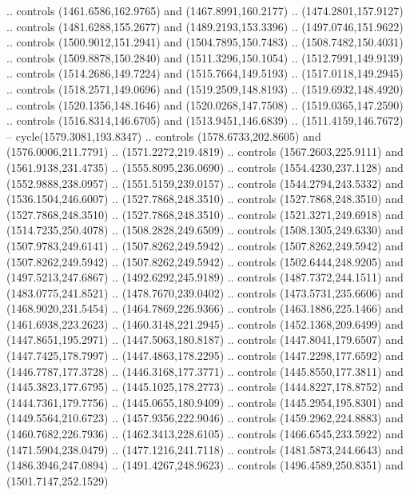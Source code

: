 \begin{scope}[shift={(-22.88722,-49.76189)}]
\begin{scope}[shift={(-739.46591,328.36782)}]
      .. controls (1461.6586,162.9765) and (1467.8991,160.2177) ..
      (1474.2801,157.9127) .. controls (1481.6288,155.2677) and (1489.2193,153.3396)
      .. (1497.0746,151.9622) .. controls (1500.9012,151.2941) and
      (1504.7895,150.7483) .. (1508.7482,150.4031) .. controls (1509.8878,150.2840)
      and (1511.3296,150.1054) .. (1512.7991,149.9139) .. controls
      (1514.2686,149.7224) and (1515.7664,149.5193) .. (1517.0118,149.2945) ..
      controls (1518.2571,149.0696) and (1519.2509,148.8193) .. (1519.6932,148.4920)
      .. controls (1520.1356,148.1646) and (1520.0268,147.7508) ..
      (1519.0365,147.2590) .. controls (1516.8314,146.6705) and (1513.9451,146.6839)
      .. (1511.4159,146.7672) -- cycle(1579.3081,193.8347) .. controls
      (1578.6733,202.8605) and (1576.0006,211.7791) .. (1571.2272,219.4819) ..
      controls (1567.2603,225.9111) and (1561.9138,231.4735) .. (1555.8095,236.0690)
      .. controls (1554.4230,237.1128) and (1552.9888,238.0957) ..
      (1551.5159,239.0157) .. controls (1544.2794,243.5332) and (1536.1504,246.6007)
      .. (1527.7868,248.3510) .. controls (1527.7868,248.3510) and
      (1527.7868,248.3510) .. (1527.7868,248.3510) .. controls (1521.3271,249.6918)
      and (1514.7235,250.4078) .. (1508.2828,249.6509) .. controls
      (1508.1305,249.6330) and (1507.9783,249.6141) .. (1507.8262,249.5942) ..
      controls (1507.8262,249.5942) and (1507.8262,249.5942) .. (1507.8262,249.5942)
      .. controls (1502.6444,248.9205) and (1497.5213,247.6867) ..
      (1492.6292,245.9189) .. controls (1487.7372,244.1511) and (1483.0775,241.8521)
      .. (1478.7670,239.0402) .. controls (1473.5731,235.6606) and
      (1468.9020,231.5454) .. (1464.7869,226.9366) .. controls (1463.1886,225.1466)
      and (1461.6938,223.2623) .. (1460.3148,221.2945) .. controls
      (1452.1368,209.6499) and (1447.8651,195.2971) .. (1447.5063,180.8187) ..
      controls (1447.8041,179.6507) and (1447.7425,178.7997) .. (1447.4863,178.2295)
      .. controls (1447.2298,177.6592) and (1446.7787,177.3728) ..
      (1446.3168,177.3771) .. controls (1445.8550,177.3811) and (1445.3823,177.6795)
      .. (1445.1025,178.2773) .. controls (1444.8227,178.8752) and
      (1444.7361,179.7756) .. (1445.0655,180.9409) .. controls (1445.2954,195.8301)
      and (1449.5564,210.6723) .. (1457.9356,222.9046) .. controls
      (1459.2962,224.8883) and (1460.7682,226.7936) .. (1462.3413,228.6105) ..
      controls (1466.6545,233.5922) and (1471.5904,238.0479) .. (1477.1216,241.7118)
      .. controls (1481.5873,244.6643) and (1486.3946,247.0894) ..
      (1491.4267,248.9623) .. controls (1496.4589,250.8351) and (1501.7147,252.1529)

\end{scope}
\end{scope}
